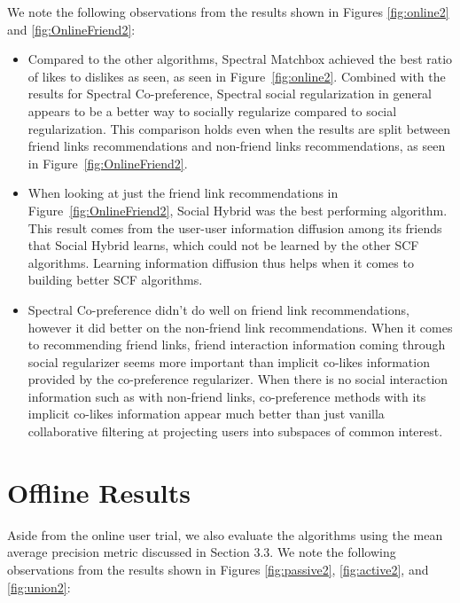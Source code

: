 We note the following observations from the results shown in Figures \ref{fig:online2} and \ref{fig:OnlineFriend2}:

\begin{itemize}
\item{Compared to the other algorithms, Spectral Matchbox achieved the best ratio of likes to dislikes as seen, as seen in Figure~\ref{fig:online2}. Combined with the results for Spectral Co-preference, Spectral social regularization in general appears to be a better way to socially regularize compared to social regularization. This comparison holds even when the results are split between friend links recommendations and non-friend links recommendations, as seen in Figure~\ref{fig:OnlineFriend2}.}

\item{When looking at just the friend link recommendations in Figure~\ref{fig:OnlineFriend2}, Social Hybrid was the best performing algorithm. This result comes from the user-user information diffusion among its friends that Social Hybrid learns, which could not be learned by the other SCF algorithms. Learning information diffusion thus helps when it comes to building better SCF algorithms.}

\item{Spectral Co-preference didn't do well on friend link recommendations, however it did better on the non-friend link recommendations. When it comes to recommending friend links, friend interaction information coming through social regularizer seems more important than implicit co-likes information provided by the co-preference regularizer. When there is no social interaction information such as with non-friend links, co-preference methods with its implicit co-likes information appear much better than just vanilla collaborative filtering at projecting users into subspaces of common interest.}
\end{itemize}

\section{Offline Results}

Aside from the online user trial, we also evaluate the algorithms using the mean average precision metric discussed in Section 3.3. We note the following observations from the results shown in Figures \ref{fig:passive2}, \ref{fig:active2}, and \ref{fig:union2}:

